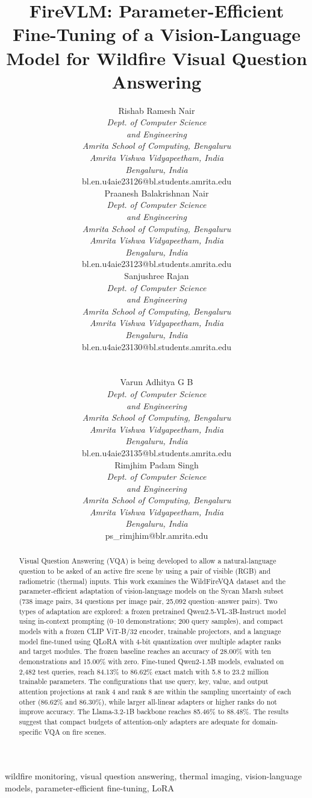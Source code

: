 \documentclass[conference]{IEEEtran}
\newcommand{\authorbox}[2]{%
  \parbox[t]{0.325\textwidth}{\centering
    {\normalsize #1}\\[1pt]
    {\footnotesize\itshape Dept. of Computer Science\\and Engineering\\
    Amrita School of Computing, Bengaluru\\
    Amrita Vishwa Vidyapeetham, India\\
    Bengaluru, India}\\[1pt]
    {\footnotesize #2}}}
\begin{document}
\title{FireVLM: Parameter-Efficient Fine-Tuning of a Vision-Language Model for Wildfire Visual Question Answering}

\author{%
\authorbox{Rishab Ramesh Nair}{bl.en.u4aie23126@bl.students.amrita.edu}%
\hfill
\authorbox{Praanesh Balakrishnan Nair}{bl.en.u4aie23123@bl.students.amrita.edu}%
\hfill
\authorbox{Sanjushree Rajan}{bl.en.u4aie23130@bl.students.amrita.edu}\\[8pt]
\authorbox{Varun Adhitya G B}{bl.en.u4aie23135@bl.students.amrita.edu}%
\hspace{0.05\textwidth}%
\authorbox{Rimjhim Padam Singh}{ps\_rimjhim@blr.amrita.edu}%
}

\maketitle

\begin{abstract}
Visual Question Answering (VQA) is being developed to allow a natural-language question to be asked of an active fire scene by using a pair of visible (RGB) and radiometric (thermal) inputs. This work examines the WildFireVQA dataset and the parameter-efficient adaptation of vision-language models on the Sycan Marsh subset (738 image pairs, 34 questions per image pair, 25,092 question--answer pairs). Two types of adaptation are explored: a frozen pretrained Qwen2.5-VL-3B-Instruct model using in-context prompting (0--10 demonstrations; 200 query samples), and compact models with a frozen CLIP ViT-B/32 encoder, trainable projectors, and a language model fine-tuned using QLoRA with 4-bit quantization over multiple adapter ranks and target modules. The frozen baseline reaches an accuracy of 28.00\% with ten demonstrations and 15.00\% with zero. Fine-tuned Qwen2-1.5B models, evaluated on 2,482 test queries, reach 84.13\% to 86.62\% exact match with 5.8 to 23.2 million trainable parameters. The configurations that use query, key, value, and output attention projections at rank 4 and rank 8 are within the sampling uncertainty of each other (86.62\% and 86.30\%), while larger all-linear adapters or higher ranks do not improve accuracy. The Llama-3.2-1B backbone reaches 85.46\% to 88.48\%. The results suggest that compact budgets of attention-only adapters are adequate for domain-specific VQA on fire scenes.
\end{abstract}

\begin{IEEEkeywords}
wildfire monitoring, visual question answering, thermal imaging,
vision-language models, parameter-efficient fine-tuning, LoRA
\end{IEEEkeywords}
\end{document}
